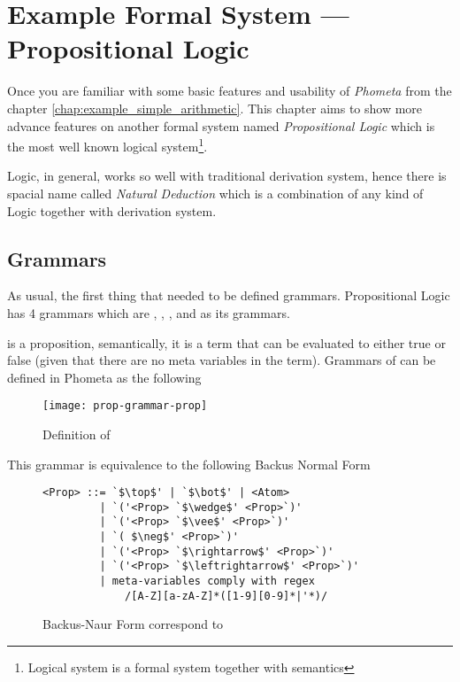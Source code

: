 \documentclass[master.tex]{subfiles}
\begin{document}
\chapter{Example Formal System --- Propositional Logic}
\label{chap:example_propositional_logic}

Once you are familiar with some basic features and usability of \emph{Phometa}
from the chapter \ref{chap:example_simple_arithmetic}. This chapter aims to show
more advance features on another formal system named \emph{Propositional Logic}
which is the most well known logical system\footnote{Logical system is a formal
  system together with semantics\supercite{formal-system-wiki}}.

Logic, in general, works so well with traditional derivation system, hence there
is spacial name called \emph{Natural Deduction} which is a combination of any
kind of Logic together with derivation system.

\section{Grammars}

As usual, the first thing that needed to be defined grammars. Propositional
Logic has 4 grammars which are , ,
, and  as its grammars.

 is a proposition, semantically, it is a term that can be evaluated
to either true or false (given that there are no meta variables in the term).
Grammars of  can be defined in Phometa as the following

\begin{figure}[H]
    \centering
\begin{minipage}{0.7\textwidth}
    \texttt{[image: prop-grammar-prop]}
\end{minipage}
\caption{Definition of }
\label{fig:prop-grammar-prop}
\end{figure}

This grammar is equivalence to the following Backus Normal Form

\begin{figure}[H]
\begin{framed}
\begin{lstlisting}[style=bnf]
<Prop> ::= `$\top$' | `$\bot$' | <Atom>
         | `('<Prop> `$\wedge$' <Prop>`)'
         | `('<Prop> `$\vee$' <Prop>`)'
         | `( $\neg$' <Prop>`)'
         | `('<Prop> `$\rightarrow$' <Prop>`)'
         | `('<Prop> `$\leftrightarrow$' <Prop>`)'
         | meta-variables comply with regex
             /[A-Z][a-zA-Z]*([1-9][0-9]*|'*)/
\end{lstlisting}
\end{framed}
\caption{Backus-Naur Form correspond to }
\label{fig:prop-bnf-prop}
\end{figure}
\end{document}
